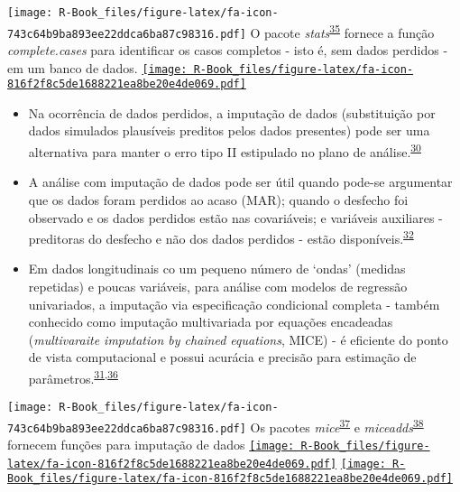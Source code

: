 \documentclass[
]{book}
\begin{document}
\texttt{[image: R-Book\_files/figure-latex/fa-icon-743c64b9ba893ee22ddca6ba87c98316.pdf]} O pacote \emph{stats}\textsuperscript{\protect\hyperlink{ref-stats}{35}} fornece a função \emph{complete.cases} para identificar os casos completos - isto é, sem dados perdidos - em um banco de dados. \href{https://stat.ethz.ch/R-manual/R-devel/library/stats/html/stats-package.html}{\texttt{[image: R-Book\_files/figure-latex/fa-icon-816f2f8c5de1688221ea8be20e4de069.pdf]}}

\begin{itemize}
\item
  Na ocorrência de dados perdidos, a imputação de dados (substituição por dados simulados plausíveis preditos pelos dados presentes) pode ser uma alternativa para manter o erro tipo II estipulado no plano de análise.\textsuperscript{\protect\hyperlink{ref-Altman2007}{30}}
\item
  A análise com imputação de dados pode ser útil quando pode-se argumentar que os dados foram perdidos ao acaso (MAR); quando o desfecho foi observado e os dados perdidos estão nas covariáveis; e variáveis auxiliares - preditoras do desfecho e não dos dados perdidos - estão disponíveis.\textsuperscript{\protect\hyperlink{ref-carpenter2021}{32}}
\item
  Em dados longitudinais co um pequeno número de `ondas' (medidas repetidas) e poucas variáveis, para análise com modelos de regressão univariados, a imputação via especificação condicional completa - também conhecido como imputação multivariada por equações encadeadas (\emph{multivaraite imputation by chained equations}, MICE) - é eficiente do ponto de vista computacional e possui acurácia e precisão para estimação de parâmetros.\textsuperscript{\protect\hyperlink{ref-Heymans2022}{31},\protect\hyperlink{ref-Cao2022}{36}}
\end{itemize}

\texttt{[image: R-Book\_files/figure-latex/fa-icon-743c64b9ba893ee22ddca6ba87c98316.pdf]} Os pacotes \emph{mice}\textsuperscript{\protect\hyperlink{ref-mice}{37}} e \emph{miceadds}\textsuperscript{\protect\hyperlink{ref-miceadds}{38}} fornecem funções para imputação de dados \href{https://cran.r-project.org/web/packages/mice/index.html}{\texttt{[image: R-Book\_files/figure-latex/fa-icon-816f2f8c5de1688221ea8be20e4de069.pdf]}} \href{https://cran.r-project.org/web/packages/miceadds/index.html}{\texttt{[image: R-Book\_files/figure-latex/fa-icon-816f2f8c5de1688221ea8be20e4de069.pdf]}}
\end{document}
